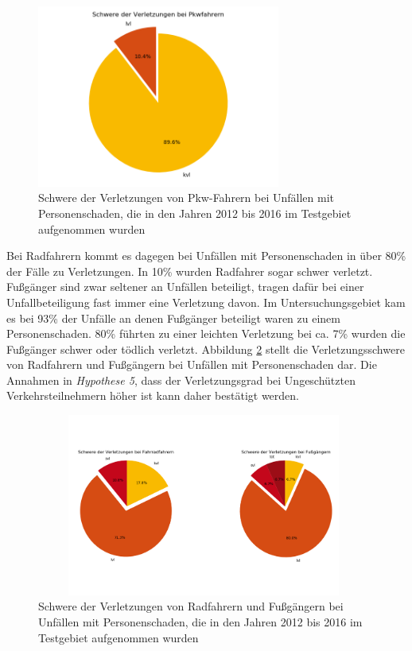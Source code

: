 \begin{savenotes}
	\begin{figure}[H]
		\centering
		\includegraphics[width=8cm,height=6cm]{figures/Verl_Pkw}
		\caption[Schwere der Verletzungen von Pkw-Fahrern bei Unfällen mit Personenschaden, die in den Jahren 2012 bis 2016 im Testgebiet aufgenommen wurden ]{Schwere der Verletzungen von Pkw-Fahrern bei Unfällen mit Personenschaden, die in den Jahren 2012 bis 2016 im Testgebiet aufgenommen wurden}\label{fig:Verletzungsschwere_Pkw}
	\end{figure}
\end{savenotes}

Bei Radfahrern kommt es dagegen bei Unfällen mit Personenschaden in über 80\% der Fälle zu Verletzungen. In 10\% wurden Radfahrer sogar schwer verletzt. Fußgänger sind zwar seltener an Unfällen beteiligt, tragen dafür bei einer Unfallbeteiligung fast immer eine Verletzung davon. Im Untersuchungsgebiet kam es bei 93\% der Unfälle an denen Fußgänger beteiligt waren zu einem Personenschaden. 80\% führten zu einer leichten Verletzung bei ca. 7\% wurden die Fußgänger schwer oder tödlich verletzt. Abbildung \ref{fig:Verletzungsschwere_Rad_Fuss} stellt die Verletzungsschwere von Radfahrern und Fußgängern bei Unfällen mit Personenschaden dar. Die Annahmen in \textit{Hypothese 5}, dass der Verletzungsgrad bei Ungeschützten Verkehrsteilnehmern höher ist kann daher bestätigt werden. 

\begin{savenotes}
	\begin{figure}[H]
		\centering
		\includegraphics[width=11cm,height=6cm]{figures/Verl_Rad_Fuss}
		\caption[Schwere der Verletzungen von Radfahrern und Fußgängern bei Unfällen mit Personenschaden, die in den Jahren 2012 bis 2016 im Testgebiet aufgenommen wurden ]{Schwere der Verletzungen von Radfahrern und Fußgängern bei Unfällen mit Personenschaden, die in den Jahren 2012 bis 2016 im Testgebiet aufgenommen wurden}\label{fig:Verletzungsschwere_Rad_Fuss}
	\end{figure}
\end{savenotes}

